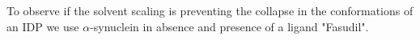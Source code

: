 To observe if the solvent scaling is preventing the collapse in the conformations of an IDP we use $\alpha$-synuclein in absence and presence of a ligand "Fasudil".
 